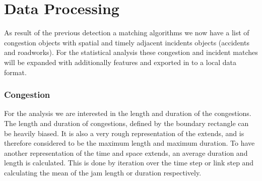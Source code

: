 \section{Data Processing}
\label{methodology_data_processing}
As result of the previous detection a matching algorithms we now have a list of congestion objects with spatial and timely adjacent incidents objects (accidents and roadworks). For the statistical analysis these congestion and incident matches will be expanded with additionally features and exported in to a local data format.

\subsubsection{Congestion}
For the analysis we are interested in the length and duration of the congestions. The length and duration of congestions, defined by the boundary rectangle can be heavily biased. It is also a very rough representation of the extends, and is therefore considered to be the maximum length and maximum duration. To have another representation of the time and space extends, an average duration and length is calculated. This is done by iteration over the time step or link step and calculating the mean of the jam length or duration respectively.

